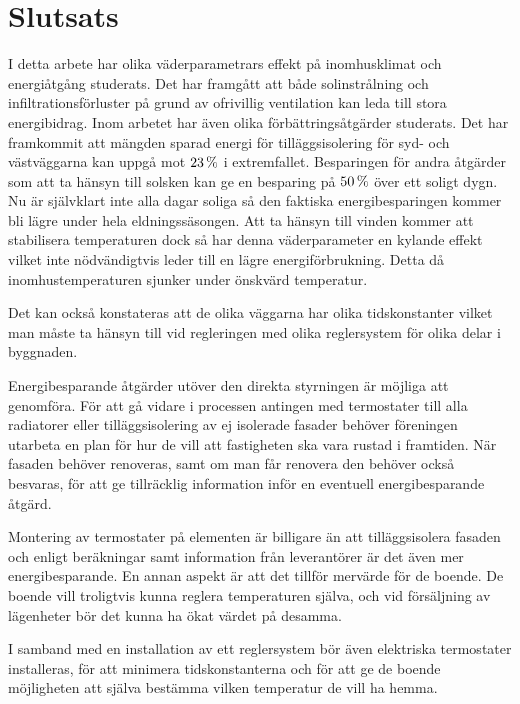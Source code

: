 \chapter{Slutsats}


I detta arbete har olika väderparametrars effekt på inomhusklimat och energiåtgång studerats.
Det har framgått att både solinstrålning och infiltrationsförluster på grund av ofrivillig
ventilation kan leda till stora energibidrag. Inom arbetet har även olika förbättringsåtgärder
studerats. Det har framkommit att mängden sparad energi för tilläggsisolering för syd- och västväggarna
kan uppgå mot $\unit[23]{\%}$ i extremfallet. Besparingen för andra åtgärder som att ta hänsyn till solsken
kan ge en besparing på $\unit[50]{\%}$ över ett soligt dygn.  Nu är självklart inte alla dagar soliga
så den faktiska energibesparingen kommer bli lägre under hela eldningssäsongen.
Att ta hänsyn till vinden kommer att stabilisera
temperaturen dock så har denna väderparameter en kylande effekt vilket inte nödvändigtvis leder
till en lägre energiförbrukning. Detta då inomhustemperaturen sjunker under önskvärd temperatur. 

Det kan också konstateras att de olika väggarna har olika tidskonstanter vilket man måste ta hänsyn till vid regleringen med olika reglersystem för olika delar i byggnaden.

Energibesparande åtgärder utöver den direkta styrningen är möjliga att genomföra. För att gå vidare i processen antingen med termostater till alla radiatorer eller tilläggsisolering av ej isolerade fasader behöver föreningen utarbeta en plan för hur de vill att fastigheten ska vara rustad i framtiden. När fasaden behöver renoveras, samt om man får renovera den behöver också besvaras, för att ge tillräcklig information inför en eventuell energibesparande åtgärd. 

Montering av termostater på elementen är billigare än att tilläggsisolera fasaden och enligt beräkningar samt information från leverantörer är det även mer energibesparande. En annan aspekt är att det tillför mervärde för de boende. De boende vill troligtvis kunna reglera temperaturen själva, och vid försäljning av lägenheter bör det kunna ha ökat värdet på desamma.

I samband med en installation av ett reglersystem bör även elektriska termostater installeras, för att minimera tidskonstanterna och för att ge de boende möjligheten att själva bestämma vilken temperatur de vill ha hemma.

